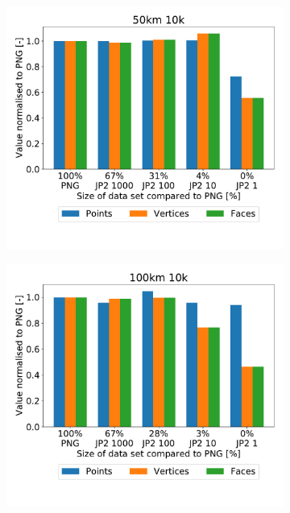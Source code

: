 \begin{figure}[htb]
    \centering
        \begin{subfigure}[b]{0.49\textwidth}
            \centering
            \includegraphics[width=\textwidth]{doc/thesis/0_figures/recon/50km_10k}
            \caption{}
            \label{fig:recon_120_50_10}
        \end{subfigure}
        \begin{subfigure}[b]{0.49\textwidth}
            \centering
            \includegraphics[width=\textwidth]{doc/thesis/0_figures/recon/100km_10k}

\end{subfigure}
\end{figure}
